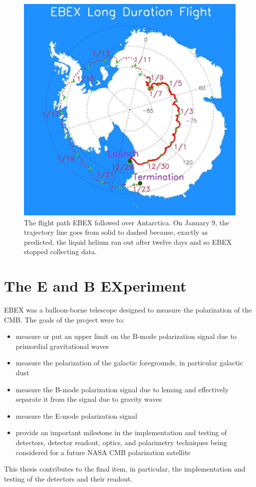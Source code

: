 \begin{figure}[htbp]
\begin{center}
\includegraphics[width=0.6\columnwidth]{figures/ebex_trajectory.jpg}
\caption[EBEX flight trajectory]{The flight path \ac{EBEX} followed over Antarctica. On January 9, the trajectory line goes from solid to dashed because, exactly as predicted, the liquid helium ran out after twelve days and so \ac{EBEX} stopped collecting data. 
\label{fig:flight_trajectory} }
\end{center}
\end{figure}




\section{The E and B EXperiment}
\label{sec:ebex}

\ac{EBEX} was a balloon-borne telescope designed to measure the polarization of the \ac{CMB}.
The goals of the project were to:
\begin{itemize}
\item measure or put an upper limit on the B-mode polarization signal due to primordial gravitational waves%
\item measure the polarization of the galactic foregrounds, in particular galactic dust
\item measure the B-mode polarization signal due to lensing and effectively separate it from the signal due to gravity waves
\item measure the E-mode polarization signal
\item provide an important milestone in the implementation and testing of detectors, detector readout, optics, and polarimetry techniques being considered for a future NASA CMB polarization satellite
\end{itemize}
This thesis contributes to the final item, in particular, the implementation and testing of the detectors and their readout. 

